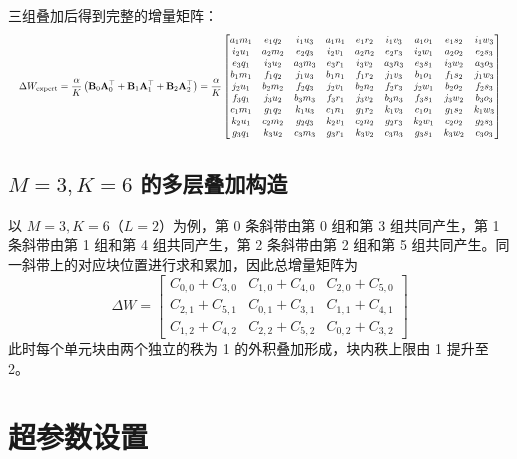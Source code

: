 ﻿\documentclass[UTF8,a4paper,11pt]{ctexart}
\newcommand{\DeltaW}{\Delta W}
\begin{document}
三组叠加后得到完整的增量矩阵：
\[
\resizebox{\linewidth}{!}{$\displaystyle
\Delta W_{\text{expert}}
= \frac{\alpha}{K}\left(\mathbf{B}_0 \mathbf{A}_0^\top+\mathbf{B}_1 \mathbf{A}_1^\top+\mathbf{B}_2 \mathbf{A}_2^\top\right)
= \frac{\alpha}{K}
\begin{bmatrix}
a_1 m_1 & e_1 q_2 & i_1 u_3 & a_1 n_1 & e_1 r_2 & i_1 v_3 & a_1 o_1 & e_1 s_2 & i_1 w_3 \\
i_2 u_1 & a_2 m_2 & e_2 q_3 & i_2 v_1 & a_2 n_2 & e_2 r_3 & i_2 w_1 & a_2 o_2 & e_2 s_3 \\
e_3 q_1 & i_3 u_2 & a_3 m_3 & e_3 r_1 & i_3 v_2 & a_3 n_3 & e_3 s_1 & i_3 w_2 & a_3 o_3 \\
b_1 m_1 & f_1 q_2 & j_1 u_3 & b_1 n_1 & f_1 r_2 & j_1 v_3 & b_1 o_1 & f_1 s_2 & j_1 w_3 \\
j_2 u_1 & b_2 m_2 & f_2 q_3 & j_2 v_1 & b_2 n_2 & f_2 r_3 & j_2 w_1 & b_2 o_2 & f_2 s_3 \\
f_3 q_1 & j_3 u_2 & b_3 m_3 & f_3 r_1 & j_3 v_2 & b_3 n_3 & f_3 s_1 & j_3 w_2 & b_3 o_3 \\
c_1 m_1 & g_1 q_2 & k_1 u_3 & c_1 n_1 & g_1 r_2 & k_1 v_3 & c_1 o_1 & g_1 s_2 & k_1 w_3 \\
k_2 u_1 & c_2 m_2 & g_2 q_3 & k_2 v_1 & c_2 n_2 & g_2 r_3 & k_2 w_1 & c_2 o_2 & g_2 s_3 \\
g_3 q_1 & k_3 u_2 & c_3 m_3 & g_3 r_1 & k_3 v_2 & c_3 n_3 & g_3 s_1 & k_3 w_2 & c_3 o_3
\end{bmatrix}
$}
\]

\subsection{$M=3,K=6$ 的多层叠加构造}
\label{app:m3k6}

以 $M=3,K=6$（$L=2$）为例，第 0 条斜带由第 0 组和第 3 组共同产生，第 1 条斜带由第 1 组和第 4 组共同产生，第 2 条斜带由第 2 组和第 5 组共同产生。同一斜带上的对应块位置进行求和累加，因此总增量矩阵为
\begin{equation}
\DeltaW=
\begin{bmatrix}
C_{0,0}+C_{3,0} & C_{1,0}+C_{4,0} & C_{2,0}+C_{5,0}\\
C_{2,1}+C_{5,1} & C_{0,1}+C_{3,1} & C_{1,1}+C_{4,1}\\
C_{1,2}+C_{4,2} & C_{2,2}+C_{5,2} & C_{0,2}+C_{3,2}
\end{bmatrix}
\end{equation}
此时每个单元块由两个独立的秩为 1 的外积叠加形成，块内秩上限由 1 提升至 2。

\section{超参数设置}
\end{document}
